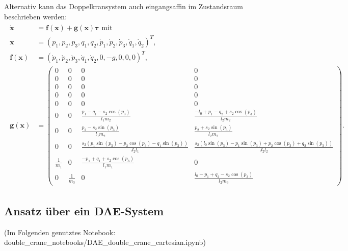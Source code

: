 Alternativ kann das Doppelkransystem auch eingangsaffin im Zustandsraum beschrieben werden:
\begin{align}
	\begin{split}
		\dot{\mathbf{x}} &= \mathbf{f}(\mathbf{x}) + \mathbf{g}(\mathbf{x}) \mathbf{\tau} \text{ mit } \\ 
		\mathbf{x} &= (p_{1},	p_{2}, p_{3}, q_{1}, q_{2}, \dot{p}_{1}, \dot{p}_{2}, \dot{p}_{3}, \dot{q}_{1}, \dot{q}_{2})^T, \\
		\mathbf{f}(\mathbf{x}) &= 
		(\dot{p}_{1}, \dot{p}_{2}, \dot{p}_{3}, \dot{q}_{1}, \dot{q}_{2}, 0, -g, 0, 0, 0)^T, \\ 
		\mathbf{g}(\mathbf{x}) &=
		\left(\begin{smallmatrix}
			0 & 0 & 0 & 0\\
			0 & 0 & 0 & 0\\
			0 & 0 & 0 & 0\\
			0 & 0 & 0 & 0\\
			0 & 0 & 0 & 0\\
			0 & 0 & \frac{p_{1} - q_{1} - s_{2} \cos{\left(p_{3} \right)}}{l_{1} m_{2}} & \frac{- l_{0} + p_{1} - q_{2} + s_{2} \cos{\left(p_{3} \right)}}{l_{2} m_{2}}\\
			0 & 0 & \frac{p_{2} - s_{2} \sin{\left(p_{3} \right)}}{l_{1} m_{2}} & \frac{p_{2} + s_{2} \sin{\left(p_{3} \right)}}{l_{2} m_{2}}\\
			0 & 0 & \frac{s_{2} \left(p_{1} \sin{\left(p_{3} \right)} - p_{2} \cos{\left(p_{3} \right)} - q_{1} \sin{\left(p_{3} \right)}\right)}{J_{2} l_{1}} & \frac{s_{2} \left(l_{0} \sin{\left(p_{3} \right)} - p_{1} \sin{\left(p_{3} \right)} + p_{2} \cos{\left(p_{3} \right)} + q_{2} \sin{\left(p_{3} \right)}\right)}{J_{2} l_{2}}\\
			\frac{1}{m_{1}} & 0 & \frac{- p_{1} + q_{1} + s_{2} \cos{\left(p_{3} \right)}}{l_{1} m_{1}} & 0\\
			0 & \frac{1}{m_{3}} & 0 & \frac{l_{0} - p_{1} + q_{2} - s_{2} \cos{\left(p_{3} \right)}}{l_{2} m_{3}}
		\end{smallmatrix}\right).
	\end{split}
\end{align}

\subsection{Ansatz über ein DAE-System}
(Im Folgenden genutztes Notebook: double\_crane\_notebooks/DAE\_double\_crane\_cartesian.ipynb)

